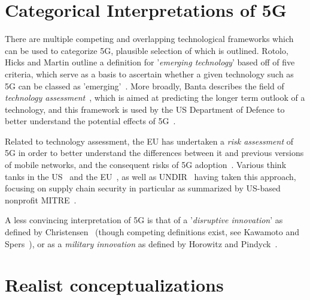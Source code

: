\section{Categorical Interpretations of 5G}

There are multiple competing and overlapping technological frameworks which can
be used to categorize 5G, plausible selection of which is outlined.
Rotolo, Hicks and Martin outline a definition for '\textit{emerging technology}'
based off of five criteria, which serve as a basis to ascertain whether a given
technology such as 5G can be classed as 'emerging'~\cite{rotolo2015emerging}.
More broadly, Banta describes the field of \textit{technology
  assessment}~\cite{banta2009technology}, which is aimed at predicting the
longer term outlook of a technology, and this framework is used by the US
Department of Defence to better understand the potential effects of
5G~\cite{csis2020panel}.

Related to technology assessment, the EU has undertaken a \textit{risk
  assessment} of 5G in order to better understand the differences between it and
previous versions of mobile networks, and the consequent risks of 5G
adoption~\cite{nis2019eucoordinated}. Various think tanks in the
US~\cite{csis2020twinpillars} and the EU~\cite{kleinhans2019whom}, as well as
UNDIR~\cite{undir2019stemming} having taken this approach, focusing on supply
chain security in particular as summarized by US-based nonprofit
MITRE~\cite{nissen2018deliver}.

A less convincing interpretation of 5G is that of a '\textit{disruptive
  innovation}' as defined by Christensen~\cite{christensen2015disruptive}
(though competing definitions exist, see Kawamoto and
Spers~\cite{tadao2019systematic}), or as a \textit{military innovation} as
defined by Horowitz and Pindyck~\cite{horowitz2019military}.

\section{Realist conceptualizations}

